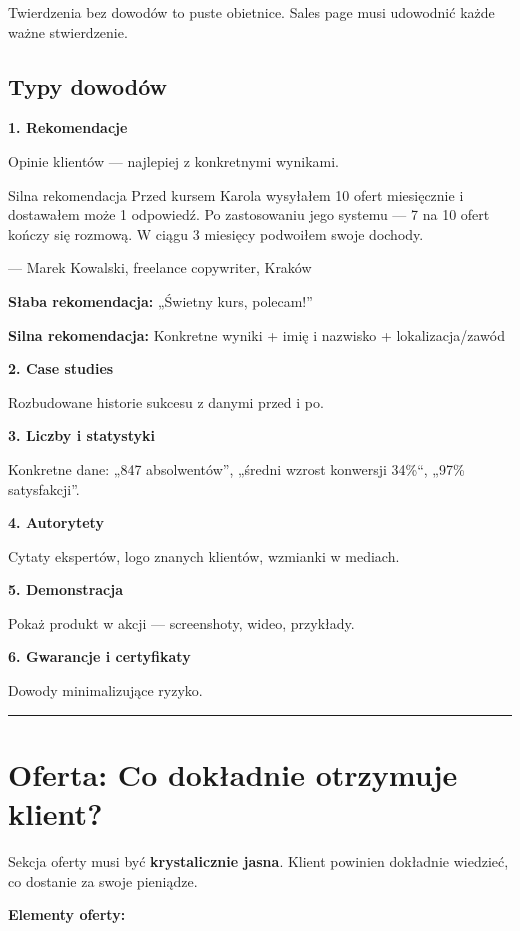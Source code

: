 \documentclass[
  12pt,
  a4paper,
  twoside,
  openright,
  12pt,
  DIV=12,
  BCOR=12mm]{scrbook}
\newcommand{\decoline}{%
  \begin{center}
    \textcolor{bordergray}{\rule{0.3\textwidth}{0.5pt}}
  \end{center}
}
\begin{document}
Twierdzenia bez dowodów to puste obietnice. Sales page musi udowodnić
każde ważne stwierdzenie.

\subsection{Typy dowodów}\label{typy-dowoduxf3w}

\textbf{1. Rekomendacje}

Opinie klientów --- najlepiej z konkretnymi wynikami.

\begin{przyklad}{Silna rekomendacja}
Przed kursem Karola wysyłałem 10 ofert miesięcznie i dostawałem może 1 odpowiedź. Po zastosowaniu jego systemu --- 7 na 10 ofert kończy się rozmową. W ciągu 3 miesięcy podwoiłem swoje dochody.

--- Marek Kowalski, freelance copywriter, Kraków
\end{przyklad}

\textbf{Słaba rekomendacja:} „Świetny kurs, polecam!''

\textbf{Silna rekomendacja:} Konkretne wyniki + imię i nazwisko +
lokalizacja/zawód

\textbf{2. Case studies}

Rozbudowane historie sukcesu z danymi przed i po.

\textbf{3. Liczby i statystyki}

Konkretne dane: „847 absolwentów'', „średni wzrost konwersji 34\%``,
„97\% satysfakcji''.

\textbf{4. Autorytety}

Cytaty ekspertów, logo znanych klientów, wzmianki w mediach.

\textbf{5. Demonstracja}

Pokaż produkt w akcji --- screenshoty, wideo, przykłady.

\textbf{6. Gwarancje i certyfikaty}

Dowody minimalizujące ryzyko.

\decoline

\section{Oferta: Co dokładnie otrzymuje
klient?}\label{oferta-co-dokux142adnie-otrzymuje-klient}

Sekcja oferty musi być \textbf{krystalicznie jasna}. Klient powinien
dokładnie wiedzieć, co dostanie za swoje pieniądze.

\textbf{Elementy oferty:}
\end{document}
